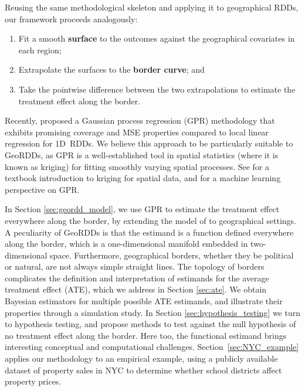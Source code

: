 \documentclass[letter]{article}
\providecommand{\tightlist}{%
      \setlength{\itemsep}{0pt}\setlength{\parskip}{0pt}}
\providecommand{\tightlist}{%
  	  \setlength{\itemsep}{0pt}\setlength{\parskip}{0pt}}
\renewcommand{\cite}[1]{\citet{#1}}
\begin{document}
Reusing the same methodological skeleton and applying it to geographical RDDs, our framework proceeds analogously:

\begin{enumerate}
\def\labelenumi{\arabic{enumi}.}
\tightlist
\item
  Fit a smooth \textbf{surface} to the outcomes against the geographical covariates in each region;
\item
  Extrapolate the surfaces to the \textbf{border curve}; and
\item
  Take the pointwise difference between the two extrapolations to estimate the treatment effect along the border.
\end{enumerate}
    


    	Recently, \cite{Branson:2017qy} proposed a Gaussian process regression (GPR) methodology that exhibits promising coverage and MSE properties compared to local linear regression for 1D~RDDs.
We believe this approach to be particularly suitable to GeoRDDs, as GPR is a well-established tool in spatial statistics (where it is known as kriging) for fitting smoothly varying spatial processes.
See \cite{banerjee2014hierarchical} for a textbook introduction to kriging for spatial data, and \cite{rasmussen2006gaussian} for a machine learning perspective on GPR.
    


    	In Section \ref{sec:geordd_model}, we use GPR to estimate the treatment effect everywhere along the border, by extending the model of \cite{Branson:2017qy} to geographical settings.
A peculiarity of GeoRDDs is that the estimand is a function defined everywhere along the border, which is a one-dimensional manifold embedded in two-dimensional space.
Furthermore, geographical borders, whether they be political or natural, are not always simple straight lines.
The topology of borders complicates the definition and interpretation of estimands for the average treatment effect (ATE), which we address in Section \ref{sec:ate}.
We obtain Bayesian estimators for multiple possible ATE estimands, and illustrate their properties through a simulation study.
In Section \ref{sec:hypothesis_testing} we turn to hypothesis testing, and propose methods to test against the null hypothesis of no treatment effect along the border.
Here too, the functional estimand brings interesting conceptual and computational challenges.
Section~\ref{sec:NYC_example} applies our methodology to an empirical example, using a publicly available dataset of property sales in NYC to determine whether school districts affect property prices.
    
\end{document}
